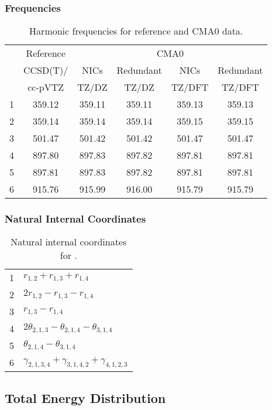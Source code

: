 \documentclass[10pt,oneside]{article}
\begin{document}
\begin{table}[h!]
\subsubsection*{Frequencies}
\centering
\caption{Harmonic frequencies for reference and CMA0 data.}
\begin{tabular}{cccccc}
\toprule
{} & Reference & \multicolumn{4}{c}{CMA0} \\
{} &  CCSD(T)/ &   NICs &  Redundant &   NICs & Redundant \\
{} &   cc-pVTZ &  TZ/DZ &      TZ/DZ & TZ/DFT &    TZ/DFT \\
\midrule
1 &    359.12 & 359.11 &     359.11 & 359.13 &    359.13 \\
2 &    359.14 & 359.14 &     359.14 & 359.15 &    359.15 \\
3 &    501.47 & 501.42 &     501.42 & 501.47 &    501.47 \\
4 &    897.80 & 897.83 &     897.82 & 897.81 &    897.81 \\
5 &    897.81 & 897.83 &     897.82 & 897.81 &    897.81 \\
6 &    915.76 & 915.99 &     916.00 & 915.79 &    915.79 \\
\bottomrule
\end{tabular}
\end{table}

\begin{table}[h!]
\subsubsection*{Natural Internal Coordinates}
\centering
\caption{Natural internal coordinates for .}
\small
\begin{tabular}{ll}
\toprule
  1   & $r_{1,2} + r_{1,3} + r_{1,4}$ \\
  2   & $2r_{1,2} - r_{1,3} - r_{1,4}$ \\
  3   & $r_{1,3} - r_{1,4}$ \\
  4   & $2\theta_{2,1,3} - \theta_{2,1,4} - \theta_{3,1,4}$ \\
  5   & $\theta_{2,1,4} - \theta_{3,1,4}$ \\
  6   & $\gamma_{2,1,3,4} + \gamma_{3,1,4,2} + \gamma_{4,1,2,3}$ \\
\bottomrule
\end{tabular}
\end{table}

\begin{table}
\subsection*{Total Energy Distribution}
\centering\end{table}
\end{document}
